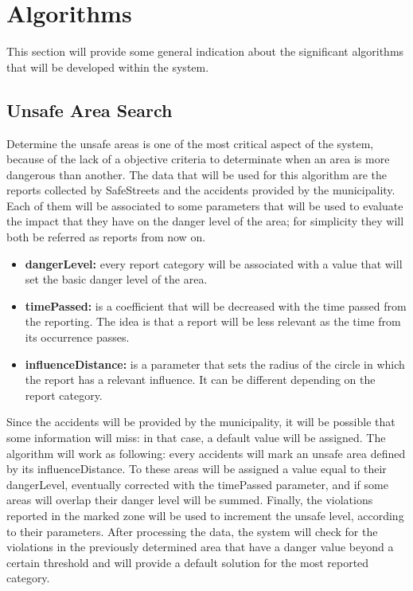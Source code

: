 \documentclass[../RASD.tex]{subfiles}
\begin{document}
    \newpage
    \section{Algorithms}\label{sec:algorithm}
    This section will provide some general indication about the significant algorithms that will be developed within the system.
    \subsection{Unsafe Area Search}\label{subsec:unsafe-area-search}
    Determine the unsafe areas is one of the most critical aspect of the system, because of the lack of a objective criteria
    to determinate when an area is more dangerous than another.
    The data that will be used for this algorithm are the reports collected by SafeStreets and the accidents provided by the municipality.
    Each of them will be associated to some parameters that will be used to evaluate the impact that they have on the danger level of the area;
    for simplicity they will both be referred as reports from now on.
    \begin{itemize}
        \item \textbf{dangerLevel:} every report category will be associated with a value that will set the basic danger level of the area.
        \item \textbf{timePassed:} is a coefficient that will be decreased with the time passed from the reporting.
        The idea is that a report will be less relevant as the time from its occurrence passes.
        \item \textbf{influenceDistance:} is a parameter that sets the radius of the circle in which the report has a relevant influence.
        It can be different depending on the report category.
    \end{itemize}
    Since the accidents will be provided by the municipality, it will be possible that some information will miss: in that case, a default value will be assigned.
    The algorithm will work as following: every accidents will mark an unsafe area defined by its influenceDistance.
    To these areas will be assigned a value equal to their dangerLevel, eventually corrected with the timePassed parameter,
    and if some areas will overlap their danger level will be summed.
    Finally, the violations reported in the marked zone will be used to increment the unsafe level, according to their parameters.
    After processing the data, the system will check for the violations in the previously determined area that have a danger value
    beyond a certain threshold and will provide a default solution for the most reported category.
\end{document}
